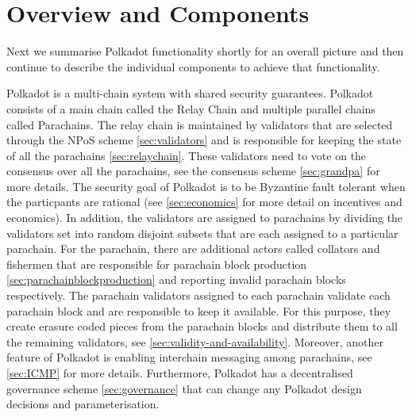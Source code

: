 \section{Overview and Components}\label{sec:components}
Next we summarise Polkadot functionality shortly for an overall picture and then continue to describe the individual components to achieve that functionality.

Polkadot is a multi-chain system with shared security guarantees. Polkadot consists of a main chain called the Relay Chain and multiple parallel chains
called Parachains. The relay chain is maintained by validators that are selected through the NPoS scheme \ref{sec:validators} and is responsible for keeping the state of all the parachains \ref{sec:relaychain}.
These validators need to vote on the consensus over all the parachains, see the consensus scheme \ref{sec:grandpa} for more details.
The security goal of Polkadot is to be Byzantine fault tolerant when the particpants are rational (see \ref{sec:economics} for more detail on incentives and economics).
In addition, the validators are assigned to parachains by dividing the validators set into random disjoint subsets that are each assigned to a particular parachain.
For the parachain, there are additional actors called collators and fishermen that are responsible for parachain block production \ref{sec:parachainblockproduction} and reporting invalid parachain blocks respectively.
The parachain validators assigned to each parachain validate each parachain block and are responsible to keep it available. For this purpose, they create erasure coded pieces from the parachain blocks and distribute
them to all the remaining validators, see \ref{sec:validity-and-availability}. Moreover, another feature of Polkadot is enabling interchain messaging among parachains, see \ref{sec:ICMP} for more details.
Furthermore, Polkadot has a decentralised governance scheme \ref{sec:governance} that can change any Polkadot design decisions and parameterisation.








